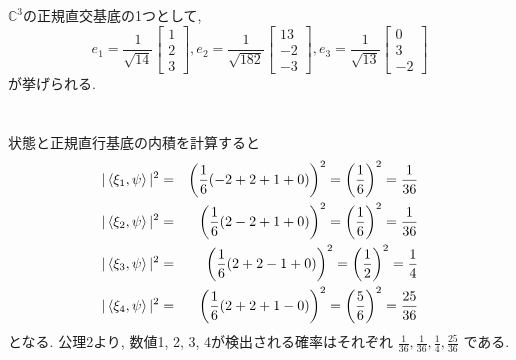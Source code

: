 \documentclass[a4paper,11pt]{jsarticle}
\begin{document}
\section{}
$\mathbb{C}^3$の正規直交基底の1つとして, 
\[
  e_1 = \frac{1}{\sqrt{14}}\begin{bmatrix}
    1 \\ 2 \\ 3
  \end{bmatrix}, 
  e_2 = \frac{1}{\sqrt{182}}\begin{bmatrix}
    13 \\ -2 \\ -3
  \end{bmatrix},
  e_3 = \frac{1}{\sqrt{13}}\begin{bmatrix}
    0 \\ 3 \\ -2
  \end{bmatrix}
\]
が挙げられる.

\section{}

状態と正規直行基底の内積を計算すると
\begin{eqnarray*}
  |\braket{\xi_1, \psi}|^2
  &=& \left(\frac{1}{6}(-2 + 2 + 1 + 0)\right)^2
  = \left(\frac{1}{6}\right)^2 = \frac{1}{36} \\
  |\braket{\xi_2, \psi}|^2
  &=& \left(\frac{1}{6}(2 - 2 + 1 + 0)\right)^2
  = \left(\frac{1}{6}\right)^2 = \frac{1}{36} \\
  |\braket{\xi_3, \psi}|^2
  &=& \left(\frac{1}{6}(2 + 2 - 1 + 0)\right)^2
  = \left(\frac{1}{2}\right)^2 = \frac{1}{4} \\
  |\braket{\xi_4, \psi}|^2
  &=& \left(\frac{1}{6}(2 + 2 + 1 - 0)\right)^2
  = \left(\frac{5}{6}\right)^2 = \frac{25}{36}
\end{eqnarray*}
となる. 公理2より, 数値1, 2, 3, 4が検出される確率はそれぞれ
$\frac{1}{36}, \frac{1}{36}, \frac{1}{4}, \frac{25}{36}$
である.
\end{document}
